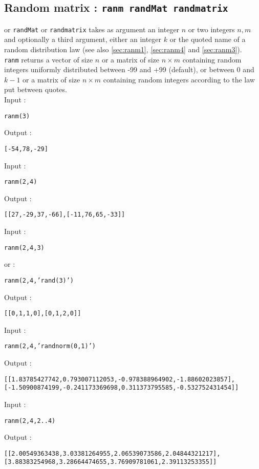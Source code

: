\documentclass[a4paper,11pt]{book}
\begin{document}
\subsection{Random matrix : {\tt ranm randMat randmatrix}}\label{sec:ranm2}
 or {\tt randMat} or {\tt randmatrix} takes as argument an 
integer $n$ or two integers $n,m$ and optionally a third argument, either an 
integer $k$ or the quoted name of a random distribution law
(see also \ref{sec:ranm1}, \ref{sec:ranm4} and \ref{sec:ranm3}).\\
{\tt ranm} returns a vector of size $n$ or a matrix of size $n\times m$
 containing random integers uniformly distributed between -99 and +99 
(default), or between 0 and $k-1$ or  a matrix  of size $n\times m$
containing random integers according to the law put between quotes.\\
Input :
\begin{center}{\tt ranm(3)}\end{center}
Output :
\begin{center}{\tt [-54,78,-29]}\end{center}
Input :
\begin{center}{\tt ranm(2,4)}\end{center}
Output :
\begin{center}{\tt [[27,-29,37,-66],[-11,76,65,-33]]}\end{center}
Input :
\begin{center}{\tt ranm(2,4,3)}\end{center}
or :
\begin{center}{\tt ranm(2,4,'rand(3)')}\end{center}
Output :
\begin{center}{\tt [[0,1,1,0],[0,1,2,0]]}\end{center}
Input :
\begin{center}{\tt ranm(2,4,'randnorm(0,1)')}\end{center}
Output :
\begin{center}{\tt [[1.83785427742,0.793007112053,-0.978388964902,-1.88602023857], [-1.50900874199,-0.241173369698,0.311373795585,-0.532752431454]]}\end{center}
Input :
\begin{center}{\tt ranm(2,4,2..4)}\end{center}
Output :
\begin{center}{\tt [[2.00549363438,3.03381264955,2.06539073586,2.04844321217],
 [3.88383254968,3.28664474655,3.76909781061,2.39113253355]]}\end{center}
\end{document}
